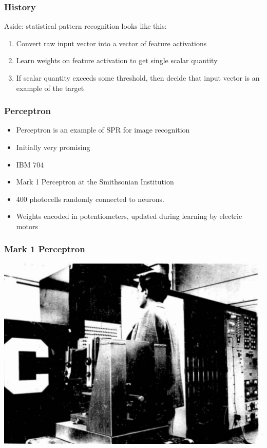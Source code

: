 \begin{frame}
  \frametitle{History}
  Aside: statistical pattern recognition looks like this:
  \begin{enumerate}
  \item Convert raw input vector into a vector of feature activations 
  \item Learn weights on feature activation to get single scalar quantity
  \item If scalar quantity exceeds some threshold, then decide that
    input vector is an example of the target
  \end{enumerate}
\end{frame}

\begin{frame}
  \frametitle{Perceptron}
  \begin{itemize}
  \item Perceptron is an example of SPR for image recognition
  \item Initially very promising
  \item<2> IBM 704 \\[3mm]
  \item<2> Mark 1 Perceptron at the Smithsonian Institution
  \item<2> 400 photocells randomly connected to neurons.
  \item<2> Weights encoded in potentiometers, updated during learning
    by electric motors
  \end{itemize}
\end{frame}

\begin{frame}
  \frametitle{Mark 1 Perceptron}
  \includegraphics[width=.9\textwidth]{mark-1-perceptron.pdf}\\
\end{frame}

